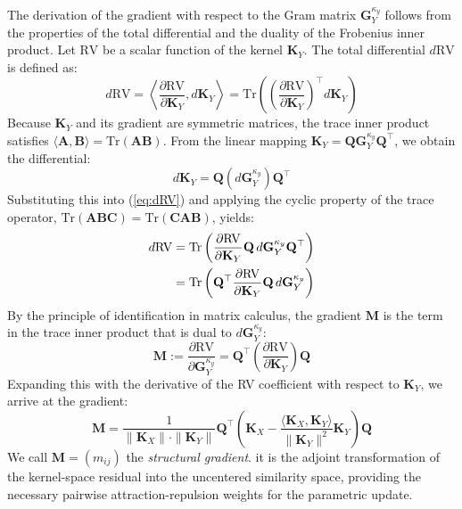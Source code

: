 \documentclass[11pt]{article}
\begin{document}
	The derivation of the gradient with respect to the Gram matrix $\mathbf{G}_Y^{\kappa_y}$ follows from the properties of the total differential and the duality of the Frobenius inner product. Let $\text{RV}$ be a scalar function of the kernel $\mathbf{K}_Y$. The total differential $d\text{RV}$ is defined as:
	\begin{equation}
		d\text{RV} = \left\langle \frac{\partial \text{RV}}{\partial \mathbf{K}_Y}, d\mathbf{K}_Y \right\rangle = \text{Tr}\left( \left( \frac{\partial \text{RV}}{\partial \mathbf{K}_Y} \right)^\top d\mathbf{K}_Y \right)
		\label{eq:dRV}
	\end{equation}
	Because $\mathbf{K}_Y$ and its gradient are symmetric matrices, the trace inner product satisfies $\langle \mathbf{A}, \mathbf{B} \rangle = \text{Tr}(\mathbf{A}\mathbf{B})$. From the linear mapping $\mathbf{K}_Y = \mathbf{Q} \mathbf{G}^{\kappa_y}_Y \mathbf{Q}^\top$, we obtain the differential:
	\begin{equation}
		d\mathbf{K}_Y = \mathbf{Q} (d\mathbf{G}^{\kappa_y}_Y) \mathbf{Q}^\top
	\end{equation}
	Substituting this into (\ref{eq:dRV}) and applying the cyclic property of the trace operator, $\text{Tr}(\mathbf{ABC}) = \text{Tr}(\mathbf{CAB})$, yields:
	\begin{align}
		d\text{RV} &= \text{Tr}\left( \frac{\partial \text{RV}}{\partial \mathbf{K}_Y} \mathbf{Q} \, d\mathbf{G}^{\kappa_y}_Y \mathbf{Q}^\top \right) \notag \\
		&= \text{Tr}\left( \mathbf{Q}^\top \frac{\partial \text{RV}}{\partial \mathbf{K}_Y} \mathbf{Q} \, d\mathbf{G}^{\kappa_y}_Y \right)
	\end{align}
	By the principle of identification in matrix calculus, the gradient $\mathbf{M}$ is the term in the trace inner product that is dual to $d\mathbf{G}^{\kappa_y}_Y$:
	\begin{equation}
		\mathbf{M} := \frac{\partial \text{RV}}{\partial \mathbf{G}^{\kappa_y}_Y} = \mathbf{Q}^\top \left( \frac{\partial \text{RV}}{\partial \mathbf{K}_Y} \right) \mathbf{Q}
	\end{equation}
	Expanding this with the derivative of the RV coefficient with respect to $\mathbf{K}_Y$, we arrive at the gradient:
	\begin{equation} \label{eq:gram_gradient_full}
		\mathbf{M} = \frac{1}{\|\mathbf{K}_X\| \cdot \|\mathbf{K}_Y\|} \mathbf{Q}^\top \left( \mathbf{K}_X - \frac{\langle \mathbf{K}_X, \mathbf{K}_Y \rangle}{\|\mathbf{K}_Y\|^2} \mathbf{K}_Y \right) \mathbf{Q}
	\end{equation}
	We call $\mathbf{M} = (m_{ij})$ the \emph{structural gradient}. it is the adjoint transformation of the kernel-space residual into the uncentered similarity space, providing the necessary pairwise attraction-repulsion weights for the parametric update.
	
\end{document}

